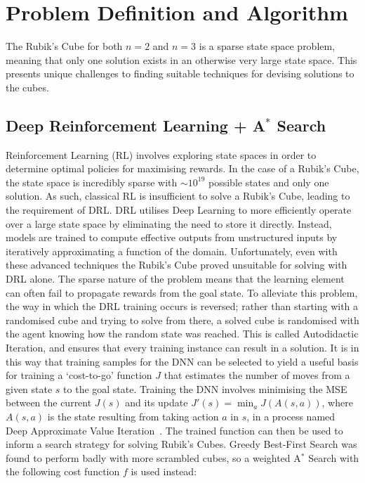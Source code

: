 \documentclass[UKenglish]{libraries/svproc}
\begin{document}
\section{Problem Definition and Algorithm}
The Rubik's Cube for both $n=2$ and $n=3$ is a sparse state space problem, meaning that only one solution exists in an otherwise very large state space. This presents unique challenges to finding suitable techniques for devising solutions to the cubes.

\subsection{Deep Reinforcement Learning + A$^{\ast}$ Search}
Reinforcement Learning (RL) involves exploring state spaces in order to determine optimal policies for maximising rewards. In the case of a Rubik's Cube, the state space is incredibly sparse with $\sim 10^{19}$ possible states and only one solution. As such, classical RL is insufficient to solve a Rubik's Cube, leading to the requirement of DRL. DRL utilises Deep Learning to more efficiently operate over a large state space by eliminating the need to store it directly. Instead, models are trained to compute effective outputs from unstructured inputs by iteratively approximating a function of the domain.
Unfortunately, even with these advanced techniques the Rubik's Cube proved unsuitable for solving with DRL alone. The sparse nature of the problem means that the learning element can often fail to propagate rewards from the goal state. To alleviate this problem, the way in which the DRL training occurs is reversed; rather than starting with a randomised cube and trying to solve from there, a solved cube is randomised with the agent knowing how the random state was reached. This is called Autodidactic Iteration, and ensures that every training instance can result in a solution. It is in this way that training samples for the DNN can be selected to yield a useful basis for training a `cost-to-go' function $J$ that estimates the number of moves from a given state $s$ to the goal state. Training the DNN involves minimising the MSE between the current $J(s)$ and its update $J'(s)=\min_aJ(A(s,a))$, where $A(s,a)$ is the state resulting from taking action $a$ in $s$, in a process named Deep Approximate Value Iteration~\cite{agostinelli2019solving}.
The trained function can then be used to inform a search strategy for solving Rubik's Cubes. Greedy Best-First Search was found to perform badly with more scrambled cubes, so a weighted A$^\ast$ Search with the following cost function $f$ is used instead:
\end{document}
